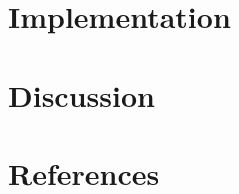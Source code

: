 \documentclass[fleqn,11pt]{SelfArx} %
\begin{document}
\section{Implementation}
\section{Discussion}
\section{References}

\thispagestyle{empty} %


\FloatBarrier



\end{document}
